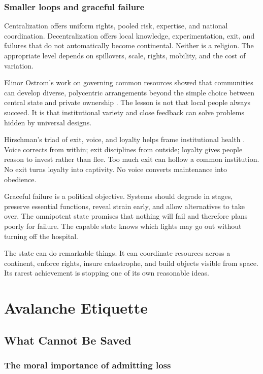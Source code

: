 \documentclass[12pt,a4paper]{book}
\begin{document}
\section{Smaller loops and graceful failure}

Centralization offers uniform rights, pooled risk, expertise, and national
coordination.  Decentralization offers local knowledge, experimentation, exit,
and failures that do not automatically become continental.  Neither is a
religion.  The appropriate level depends on spillovers, scale, rights, mobility,
and the cost of variation.

Elinor Ostrom's work on governing common resources showed that communities can
develop diverse, polycentric arrangements beyond the simple choice between
central state and private ownership \cite{OstromGoverningCommons1990}.  The
lesson is not that local people always succeed.  It is that institutional
variety and close feedback can solve problems hidden by universal designs.

Hirschman's triad of exit, voice, and loyalty helps frame institutional health
\cite{HirschmanExitVoice1970}.  Voice corrects from within; exit disciplines
from outside; loyalty gives people reason to invest rather than flee.  Too much
exit can hollow a common institution.  No exit turns loyalty into captivity.
No voice converts maintenance into obedience.

Graceful failure is a political objective.  Systems should degrade in stages,
preserve essential functions, reveal strain early, and allow alternatives to
take over.  The omnipotent state promises that nothing will fail and therefore
plans poorly for failure.  The capable state knows which lights may go out
without turning off the hospital.

The state can do remarkable things.  It can coordinate resources across a
continent, enforce rights, insure catastrophe, and build objects visible from
space.  Its rarest achievement is stopping one of its own reasonable ideas.

\part{Avalanche Etiquette}

\chapter{What Cannot Be Saved}
\label{chap:cannot-be-saved}

\section{The moral importance of admitting loss}
\end{document}
